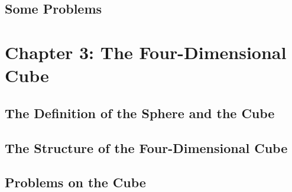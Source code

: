 \documentclass[10pt]{article}
\begin{document}
\subsection{Some Problems}


\section{Chapter 3: The Four-Dimensional Cube}

\subsection{The Definition of the Sphere and the Cube}

\subsection{The Structure of the Four-Dimensional Cube}

\subsection{Problems on the Cube}

 
\end{document}
